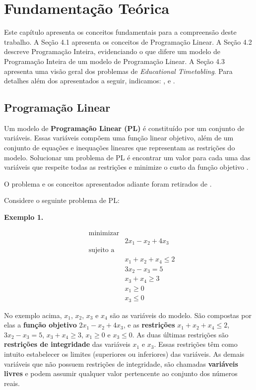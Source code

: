 \chapter{Fundamentação Teórica}
\label{cap:fundamentacao-teorica}

Este capítulo apresenta os conceitos fundamentais para a compreensão deste trabalho. A Seção 4.1 apresenta os conceitos de Programação Linear. A Seção 4.2 descreve Programação Inteira, evidenciando o que difere um modelo de Programação Inteira de um modelo de Programação Linear. A Seção 4.3 apresenta uma visão geral dos problemas de \textit{Educational Timetabling}. Para detalhes além dos apresentados a seguir, indicamos: ,   e .

\section{Programação Linear}

Um modelo de \textbf{Programação Linear (PL)} é constituído por um conjunto de variáveis. Essas variáveis compõem uma função linear objetivo, além de um conjunto de equações e inequações lineares que representam as restrições do modelo. Solucionar um problema de PL é encontrar um valor para cada uma das variáveis que respeite todas as restrições e minimize o custo da função objetivo \cite{bertsimas1997introduction}. 

O problema e os conceitos apresentados adiante foram retirados de .

Considere o seguinte problema de PL:

\textbf{Exemplo 1.}

\begin{equation*}
\begin{aligned}
& \text{minimizar} \\
& &  2x_1 - x_2 + 4x_3 \\
& \text{sujeito a} \\
& & x_1 + x_2 + x_4 \leq 2 \\
& & 3x_2 - x_3 = 5 \\
& & x_3 + x_4 \geq 3 \\
& & x_1 \geq 0 \\ 
& & x_3 \leq 0
\end{aligned}
\end{equation*}

No exemplo acima, $x_1$, $x_2$, $x_3$ e $x_4$ são as variáveis do modelo. São compostas por elas a \textbf{função objetivo} $2x_1 - x_2 + 4x_3$, e as \textbf{restrições} $x_1 + x_2 + x_4 \leq 2$, $3x_2 - x_3 = 5$, $x_3 + x_4 \geq 3$, $x_1 \geq 0$ e $x_3 \leq 0$. As duas últimas restrições são \textbf{restrições de integridade} das variáveis $x_1$ e $x_3$. Essas restrições têm como intuito estabelecer os limites (superiores ou inferiores) das variáveis. As demais variáveis que não possuem restrições de integridade, são chamadas \textbf{variáveis livres} e podem assumir qualquer valor  pertencente ao conjunto dos números reais. 

